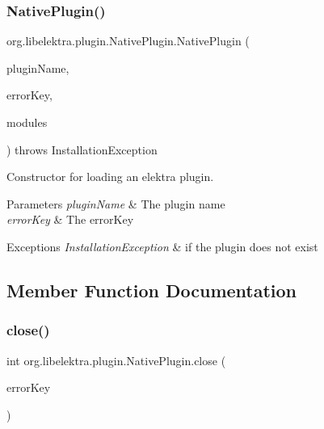 \subsubsection{\texorpdfstring{NativePlugin()}{NativePlugin()}}
{\footnotesize\ttfamily org.\+libelektra.\+plugin.\+Native\+Plugin.\+Native\+Plugin (\begin{DoxyParamCaption}\item[{String}]{plugin\+Name,  }\item[{\mbox{\hyperlink{classorg_1_1libelektra_1_1Key}{Key}}}]{error\+Key,  }\item[{\mbox{\hyperlink{classorg_1_1libelektra_1_1KeySet}{Key\+Set}}}]{modules }\end{DoxyParamCaption}) throws Installation\+Exception\hspace{0.3cm}{\ttfamily [inline]}}



Constructor for loading an elektra plugin. 


\begin{DoxyParams}{Parameters}
{\em plugin\+Name} & The plugin name \\
\hline
{\em error\+Key} & The error\+Key \\
\hline
\end{DoxyParams}

\begin{DoxyExceptions}{Exceptions}
{\em Installation\+Exception} & if the plugin does not exist \\
\hline
\end{DoxyExceptions}


\subsection{Member Function Documentation}
\mbox{\label{classorg_1_1libelektra_1_1plugin_1_1NativePlugin_acd6f4e0e81a11a1eba64dfa164c67a1f}} 
\subsubsection{\texorpdfstring{close()}{close()}}
{\footnotesize\ttfamily int org.\+libelektra.\+plugin.\+Native\+Plugin.\+close (\begin{DoxyParamCaption}\item[{\mbox{\hyperlink{classorg_1_1libelektra_1_1Key}{Key}}}]{error\+Key }\end{DoxyParamCaption})\hspace{0.3cm}{\ttfamily [inline]}}



